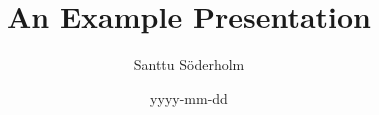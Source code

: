 \documentclass[tikz]{beamer}
\title{An Example Presentation}
\date{yyyy-mm-dd}
\author[Söderholm]{Santtu Söderholm}
\begin{document}
  \begin{frame}
    \titlepage
  \end{frame}

  \begin{frame}
    
  \end{frame}
\end{document}
